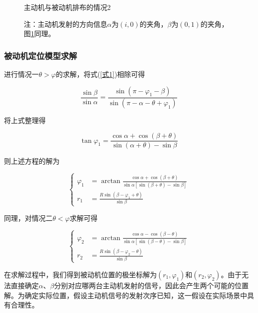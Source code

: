 \documentclass[withoutpreface,bwprint]{cumcmthesis} %
\begin{document}
\begin{figure}[H]
\begin{minipage}{0.49\textwidth}
        \caption{主动机与被动机排布的情况2}
        \label{q1_2}   
    \end{minipage}
    \caption*{\small 注：主动机发射的方向信息$\alpha$为$(i,0)$的夹角，$\beta$为$(0,1)$的夹角，图\ref{q1_2}同理。}
\end{figure}



\subsubsection{被动机定位模型求解}

进行情况一$\theta>\varphi$的求解，将式(\ref{式1})相除可得

\begin{equation}
    \frac{\sin\beta}{\sin\alpha} = \frac{\sin(\pi - \varphi_1 -\beta)}{\sin(\pi - \alpha - \theta + \varphi_1)}
\end{equation}

将上式整理得

\begin{equation}
    \tan\varphi_1= \frac{\cos\alpha + \cos(\beta +\theta)}{\sin(\alpha+\theta)- \sin\beta}
\end{equation}

则上述方程的解为

\begin{equation}
    \left\{
        \begin{aligned}
            \varphi_1 &= \arctan \frac{\cos\alpha+\cos(\beta+\theta)}{\sin\alpha[\sin(\beta+\theta)-\sin\beta]} \\
            r_1 &= \frac{R \sin(\beta-\varphi_1+\theta)}{\sin\beta}
        \end{aligned}
    \right.
    \label{解1}
\end{equation}

同理，对情况二$\theta<\varphi$求解可得

\begin{equation}
    \left\{
        \begin{aligned}
            \varphi_2 &= \arctan \frac{\cos\alpha-\cos(\beta-\theta)}{\sin\alpha[\sin(\beta-\theta)-\sin\beta]} \\
            r_2 &= \frac{R \sin(\beta-\varphi_2-\theta)}{\sin\beta}
        \end{aligned}
    \right.
\end{equation}

在求解过程中，我们得到被动机位置的极坐标解为\((r_1,\varphi_1)\)和\((r_2,\varphi_2)\)。由于无法直接确定\(\alpha\)、\(\beta\)分别对应哪两台主动机发射的信号，因此会产生两个可能的位置解。为确定实际位置，假设主动机信号的发射次序已知，这一假设在实际场景中具有合理性。
\end{document}
